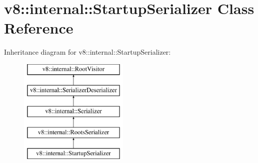 \hypertarget{classv8_1_1internal_1_1StartupSerializer}{}\section{v8\+:\+:internal\+:\+:Startup\+Serializer Class Reference}
\label{classv8_1_1internal_1_1StartupSerializer}
Inheritance diagram for v8\+:\+:internal\+:\+:Startup\+Serializer\+:\begin{figure}[H]
\begin{center}
\leavevmode
\includegraphics[height=5.000000cm]{classv8_1_1internal_1_1StartupSerializer}
\end{center}
\end{figure}
